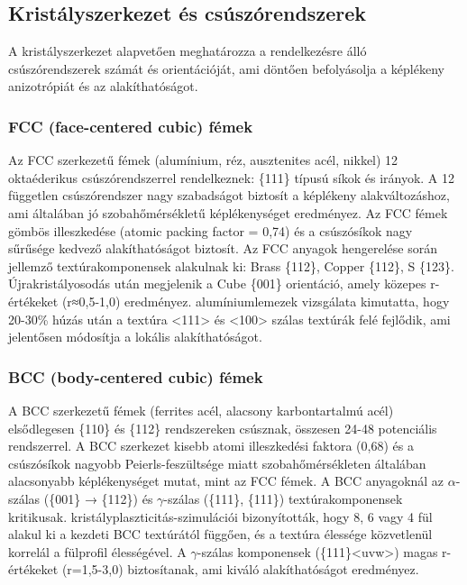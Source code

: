 \documentclass[12pt,a4paper,oneside]{report}
\begin{document}
\subsection{Kristályszerkezet és csúszórendszerek}
A kristályszerkezet alapvetően meghatározza a rendelkezésre álló csúszórendszerek számát és orientációját, ami döntően befolyásolja a képlékeny anizotrópiát és az alakíthatóságot.

\subsubsection*{FCC (face-centered cubic) fémek}
Az FCC szerkezetű fémek (alumínium, réz, ausztenites acél, nikkel) 12 oktaéderikus csúszórendszerrel rendelkeznek: \{111\}<110> típusú síkok és irányok. A 12 független csúszórendszer nagy szabadságot biztosít a képlékeny alakváltozáshoz, ami általában jó szobahőmérsékletű képlékenységet eredményez. Az FCC fémek gömbös illeszkedése (atomic packing factor = 0,74) és a csúszósíkok nagy sűrűsége kedvező alakíthatóságot biztosít. Az FCC anyagok hengerelése során jellemző textúrakomponensek alakulnak ki: Brass \{112\}<111>, Copper \{112\}<111>, S \{123\}<634>. Újrakristályosodás után megjelenik a Cube \{001\}<100> orientáció, amely közepes r-értékeket (r≈0,5-1,0) eredményez. \cite{Savoie1996} alumíniumlemezek vizsgálata kimutatta, hogy 20-30\% húzás után a textúra <111> és <100> szálas textúrák felé fejlődik, ami jelentősen módosítja a lokális alakíthatóságot.

\subsubsection*{BCC (body-centered cubic) fémek}
A BCC szerkezetű fémek (ferrites acél, alacsony karbontartalmú acél) elsődlegesen \{110\}<111> és \{112\}<111> rendszereken csúsznak, összesen 24-48 potenciális rendszerrel. A BCC szerkezet kisebb atomi illeszkedési faktora (0,68) és a csúszósíkok nagyobb Peierls-feszültsége miatt szobahőmérsékleten általában alacsonyabb képlékenységet mutat, mint az FCC fémek. A BCC anyagoknál az $\alpha$-szálas (\{001\}<110> → \{112\}<110>) és $\gamma$-szálas (\{111\}<110>, \{111\}<112>) textúrakomponensek kritikusak. \cite{Raabe2005} kristályplaszticitás-szimulációi bizonyították, hogy 8, 6 vagy 4 fül alakul ki a kezdeti BCC textúrától függően, és a textúra élessége közvetlenül korrelál a fülprofil élességével. A $\gamma$-szálas komponensek (\{111\}<uvw>) magas r-értékeket (r=1,5-3,0) biztosítanak, ami kiváló alakíthatóságot eredményez.
\end{document}
